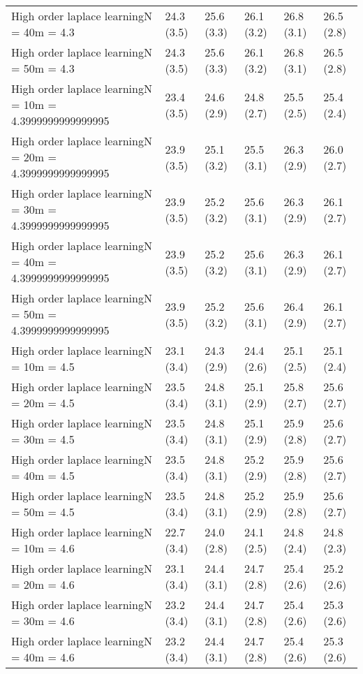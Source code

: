\documentclass{article}
\begin{document}
\begin{table*}[t!]
\begin{center}
\begin{small}
\begin{sc}
\begin{tabular}{llllll}
High order laplace learningN = 40m = 4.3&24.3 (3.5)      &25.6 (3.3)      &26.1 (3.2)      &26.8 (3.1)      &26.5 (2.8)      \\
High order laplace learningN = 50m = 4.3&24.3 (3.5)      &25.6 (3.3)      &26.1 (3.2)      &26.8 (3.1)      &26.5 (2.8)      \\
High order laplace learningN = 10m = 4.3999999999999995&23.4 (3.5)      &24.6 (2.9)      &24.8 (2.7)      &25.5 (2.5)      &25.4 (2.4)      \\
High order laplace learningN = 20m = 4.3999999999999995&23.9 (3.5)      &25.1 (3.2)      &25.5 (3.1)      &26.3 (2.9)      &26.0 (2.7)      \\
High order laplace learningN = 30m = 4.3999999999999995&23.9 (3.5)      &25.2 (3.2)      &25.6 (3.1)      &26.3 (2.9)      &26.1 (2.7)      \\
High order laplace learningN = 40m = 4.3999999999999995&23.9 (3.5)      &25.2 (3.2)      &25.6 (3.1)      &26.3 (2.9)      &26.1 (2.7)      \\
High order laplace learningN = 50m = 4.3999999999999995&23.9 (3.5)      &25.2 (3.2)      &25.6 (3.1)      &26.4 (2.9)      &26.1 (2.7)      \\
High order laplace learningN = 10m = 4.5&23.1 (3.4)      &24.3 (2.9)      &24.4 (2.6)      &25.1 (2.5)      &25.1 (2.4)      \\
High order laplace learningN = 20m = 4.5&23.5 (3.4)      &24.8 (3.1)      &25.1 (2.9)      &25.8 (2.7)      &25.6 (2.7)      \\
High order laplace learningN = 30m = 4.5&23.5 (3.4)      &24.8 (3.1)      &25.1 (2.9)      &25.9 (2.8)      &25.6 (2.7)      \\
High order laplace learningN = 40m = 4.5&23.5 (3.4)      &24.8 (3.1)      &25.2 (2.9)      &25.9 (2.8)      &25.6 (2.7)      \\
High order laplace learningN = 50m = 4.5&23.5 (3.4)      &24.8 (3.1)      &25.2 (2.9)      &25.9 (2.8)      &25.6 (2.7)      \\
High order laplace learningN = 10m = 4.6&22.7 (3.4)      &24.0 (2.8)      &24.1 (2.5)      &24.8 (2.4)      &24.8 (2.3)      \\
High order laplace learningN = 20m = 4.6&23.1 (3.4)      &24.4 (3.1)      &24.7 (2.8)      &25.4 (2.6)      &25.2 (2.6)      \\
High order laplace learningN = 30m = 4.6&23.2 (3.4)      &24.4 (3.1)      &24.7 (2.8)      &25.4 (2.6)      &25.3 (2.6)      \\
High order laplace learningN = 40m = 4.6&23.2 (3.4)      &24.4 (3.1)      &24.7 (2.8)      &25.4 (2.6)      &25.3 (2.6)      \\

\end{tabular}
\end{sc}
\end{small}
\end{center}
\end{table*}
\end{document}
